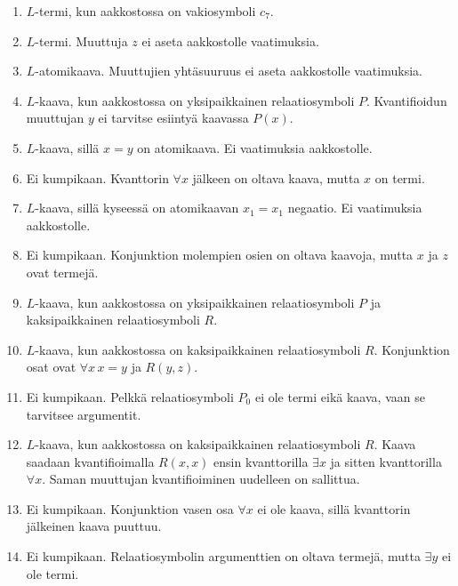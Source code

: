 \documentclass[11pt,a4paper]{amsart}
\begin{document}
\begin{solution}
  \leavevmode\par
  \begin{enumerate}[label=(\alph*)]
    \item \(L\)-termi, kun aakkostossa on vakiosymboli \(c_7\).
    \item \(L\)-termi. Muuttuja \(z\) ei aseta aakkostolle vaatimuksia.
    \item \(L\)-atomikaava. Muuttujien yhtäsuuruus ei aseta aakkostolle
      vaatimuksia.
    \item \(L\)-kaava, kun aakkostossa on yksipaikkainen relaatiosymboli
      \(P\). Kvantifioidun muuttujan \(y\) ei tarvitse esiintyä
      kaavassa \(P(x)\).
    \item \(L\)-kaava, sillä \(x = y\) on atomikaava.
      Ei vaatimuksia aakkostolle.
    \item Ei kumpikaan. Kvanttorin \(\forall x\) jälkeen on oltava kaava,
      mutta \(x\) on termi.
    \item \(L\)-kaava, sillä kyseessä on atomikaavan \(x_1 = x_1\)
      negaatio. Ei vaatimuksia aakkostolle.
    \item Ei kumpikaan. Konjunktion molempien osien on oltava kaavoja,
      mutta \(x\) ja \(z\) ovat termejä.
    \item \(L\)-kaava, kun aakkostossa on yksipaikkainen relaatiosymboli
      \(P\) ja kaksipaikkainen relaatiosymboli \(R\).
    \item \(L\)-kaava, kun aakkostossa on kaksipaikkainen relaatiosymboli
      \(R\). Konjunktion osat ovat \(\forall x\, x = y\) ja \(R(y,z)\).
    \item Ei kumpikaan. Pelkkä relaatiosymboli \(P_0\) ei ole termi eikä
      kaava, vaan se tarvitsee argumentit.
    \item \(L\)-kaava, kun aakkostossa on kaksipaikkainen relaatiosymboli
      \(R\). Kaava saadaan kvantifioimalla \(R(x,x)\) ensin kvanttorilla
      \(\exists x\) ja sitten kvanttorilla \(\forall x\). Saman muuttujan
      kvantifioiminen uudelleen on sallittua.
    \item Ei kumpikaan. Konjunktion vasen osa \(\forall x\) ei ole kaava,
      sillä kvanttorin jälkeinen kaava puuttuu.
    \item Ei kumpikaan. Relaatiosymbolin argumenttien on oltava termejä,
      mutta \(\exists y\) ei ole termi.
  \end{enumerate}
\end{solution}
\end{document}
